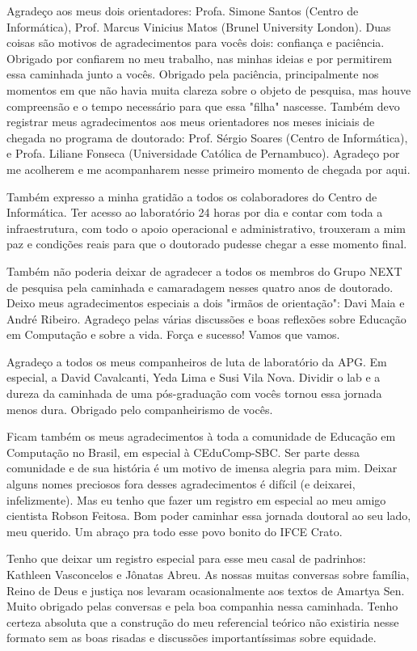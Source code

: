 \begin{agradecimentos}
Agradeço aos meus dois orientadores: Profa. Simone Santos (Centro de Informática), Prof. Marcus Vinicius Matos (Brunel University London). Duas coisas são motivos de agradecimentos para vocês dois: confiança e paciência. Obrigado por confiarem no meu trabalho, nas minhas ideias e por permitirem essa caminhada junto a vocês. Obrigado pela paciência, principalmente nos momentos em que não havia muita clareza sobre o objeto de pesquisa, mas houve compreensão e o tempo necessário para que essa "filha" nascesse. Também devo registrar meus agradecimentos aos meus orientadores nos meses iniciais de chegada no programa de doutorado:  Prof. Sérgio Soares (Centro de Informática), e Profa. Liliane Fonseca (Universidade Católica de Pernambuco). Agradeço por me acolherem e me acompanharem nesse primeiro momento de chegada por aqui.

Também expresso a minha gratidão a todos os colaboradores do Centro de Informática. 
Ter acesso ao laboratório 24 horas por dia e contar com toda a infraestrutura, com todo o apoio operacional e administrativo, trouxeram a mim paz e condições reais para que o doutorado pudesse chegar a esse momento final.

Também não poderia deixar de agradecer a todos os membros do Grupo NEXT de pesquisa pela caminhada e camaradagem nesses quatro anos de doutorado. Deixo meus agradecimentos especiais a dois "irmãos de orientação": Davi Maia e André Ribeiro. Agradeço pelas várias discussões e boas reflexões sobre Educação em Computação e sobre a vida. Força e sucesso! Vamos que vamos.

Agradeço a todos os meus companheiros de luta de laboratório da APG. Em especial, a David Cavalcanti, Yeda Lima e Susi Vila Nova. Dividir o lab e a dureza da caminhada de uma pós-graduação com vocês tornou essa jornada menos dura. Obrigado pelo companheirismo de vocês.

Ficam também os meus agradecimentos à toda a comunidade de Educação em Computação no Brasil, em especial à CEduComp-SBC. Ser parte dessa comunidade e de sua história é um motivo de imensa alegria para mim. Deixar alguns nomes preciosos fora desses agradecimentos é difícil (e deixarei, infelizmente). Mas eu tenho que fazer um registro em especial ao meu amigo cientista Robson Feitosa. Bom poder caminhar essa jornada doutoral ao seu lado, meu querido. Um abraço pra todo esse povo bonito do IFCE Crato.

Tenho que deixar um registro especial para esse meu casal de padrinhos: Kathleen Vasconcelos e Jônatas Abreu. As nossas muitas conversas sobre família, Reino de Deus e justiça nos levaram ocasionalmente aos textos de Amartya Sen. Muito obrigado pelas conversas e pela boa compa\-nhia nessa caminhada. Tenho certeza absoluta que a construção do meu referencial teórico não existiria nesse formato sem as boas risadas e discussões importantíssimas sobre equidade.


\end{agradecimentos}
